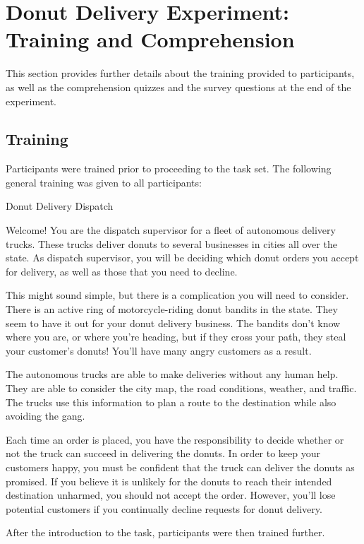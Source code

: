 \section{Donut Delivery Experiment: Training and Comprehension} \label{sec:experiment_details}
This section provides further details about the training provided to participants, as well as the comprehension quizzes and the survey questions at the end of the experiment.

\subsection{Training} \label{sec:training}
Participants were trained prior to proceeding to the task set. The following general training was given to all participants:

\begin{quoting}
    Donut Delivery Dispatch

    Welcome! You are the dispatch supervisor for a fleet of autonomous delivery trucks. These trucks deliver donuts to several businesses in cities all over the state. As dispatch supervisor, you will be deciding which donut orders you accept for delivery, as well as those that you need to decline.

    This might sound simple, but there is a complication you will need to consider. There is an active ring of motorcycle-riding donut bandits in the state. They seem to have it out for your donut delivery business. The bandits don't know where you are, or where you're heading, but if they cross your path, they steal your customer's donuts! You'll have many angry customers as a result.

    The autonomous trucks are able to make deliveries without any human help. They are able to consider the city map, the road conditions, weather, and traffic. The trucks use this information to plan a route to the destination while also avoiding the gang.

    Each time an order is placed, you have the responsibility to decide whether or not the truck can succeed in delivering the donuts. In order to keep your customers happy, you must be confident that the truck can deliver the donuts as promised. If you believe it is unlikely for the donuts to reach their intended destination unharmed, you should not accept the order. However, you'll lose potential customers if you continually decline requests for donut delivery.
\end{quoting}

After the introduction to the task, participants were then trained further.

